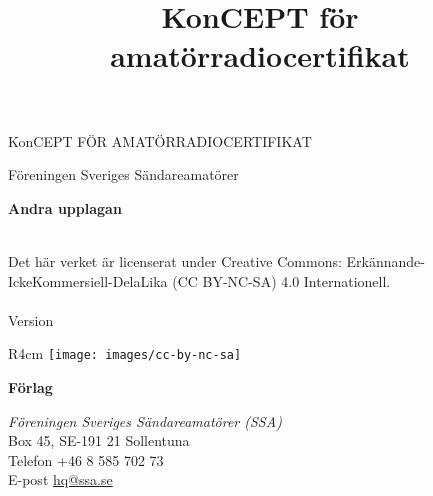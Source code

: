 \vspace{10em}
\title{KonCEPT för amatörradiocertifikat}
\begin{center}
\Large{KonCEPT FÖR AMATÖRRADIOCERTIFIKAT}

Föreningen Sveriges Sändareamatörer\\[2\baselineskip]
\end{center}


\noindent \textbf{Andra upplagan}

\noindent
\\
\noindent Det här verket är licenserat under Creative Commons:\newline
\noindent Erkännande-IckeKommersiell-DelaLika (CC BY-NC-SA) 4.0 Internationell.
\\
\\
\noindent Version \revision

\begin{wrapfigure}{R}{4cm}
    \texttt{[image: images/cc-by-nc-sa]}
\end{wrapfigure}


\vfill

\noindent
\textbf{Förlag}

\noindent
\textit{Föreningen Sveriges Sändareamatörer (SSA)}\\
Box 45, SE-191 21 Sollentuna\\
Telefon +46 8 585 702 73\\
E-post \href{mailto:hq@ssa.se}{hq@ssa.se}\\[\baselineskip]
